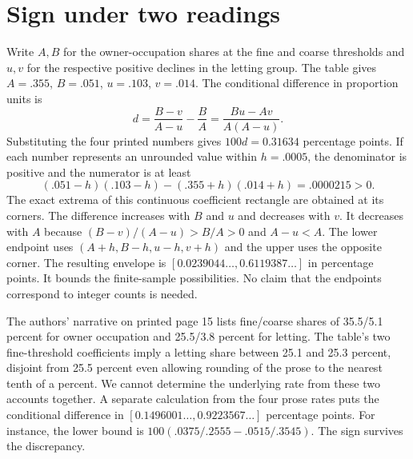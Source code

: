 \documentclass[11pt]{article}
\begin{document}
\section{Sign under two readings}
Write $A,B$ for the owner-occupation shares at the fine and coarse thresholds and $u,v$ for the respective positive declines in the letting group. The table gives $A=.355$, $B=.051$, $u=.103$, $v=.014$. The conditional difference in proportion units is
\[
d=\frac{B-v}{A-u}-\frac BA=\frac{Bu-Av}{A(A-u)}.
\]
Substituting the four printed numbers gives $100d=0.31634$ percentage points. If each number represents an unrounded value within $h=.0005$, the denominator is positive and the numerator is at least
\[
(.051-h)(.103-h)-(.355+h)(.014+h)=.0000215>0.
\]
The exact extrema of this continuous coefficient rectangle are obtained at its corners. The difference increases with $B$ and $u$ and decreases with $v$. It decreases with $A$ because $(B-v)/(A-u)>B/A>0$ and $A-u<A$. The lower endpoint uses $(A+h,B-h,u-h,v+h)$ and the upper uses the opposite corner. The resulting envelope is $[0.0239044\ldots,0.6119387\ldots]$ in percentage points. It bounds the finite-sample possibilities. No claim that the endpoints correspond to integer counts is needed.

The authors' narrative on printed page 15 lists fine/coarse shares of 35.5/5.1 percent for owner occupation and 25.5/3.8 percent for letting. The table's two fine-threshold coefficients imply a letting share between 25.1 and 25.3 percent, disjoint from 25.5 percent even allowing rounding of the prose to the nearest tenth of a percent. We cannot determine the underlying rate from these two accounts together. A separate calculation from the four prose rates puts the conditional difference in $[0.1496001\ldots,0.9223567\ldots]$ percentage points. For instance, the lower bound is $100(.0375/.2555-.0515/.3545)$. The sign survives the discrepancy.
\end{document}
